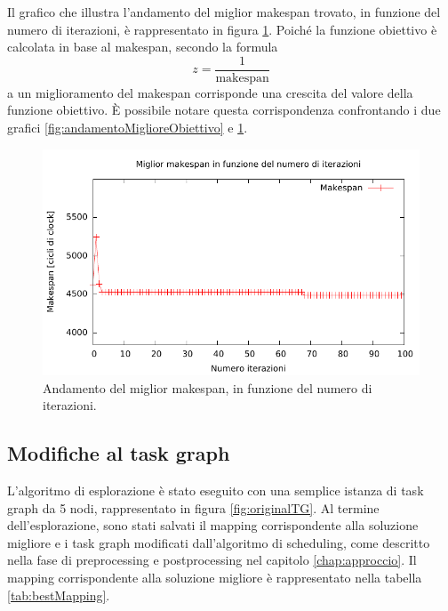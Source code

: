 Il grafico che illustra l'andamento del miglior makespan trovato, in funzione del numero
di iterazioni, \`e rappresentato in figura \ref{fig:andamentoMigliorMakespan}.
Poich\'e la funzione obiettivo \`e calcolata in base al makespan, secondo la formula
\begin{displaymath}
 z = \frac{1}{\text{makespan}}
\end{displaymath}
a un miglioramento del makespan corrisponde una crescita del valore della funzione obiettivo.
\`E possibile notare questa corrispondenza confrontando i due grafici \ref{fig:andamentoMiglioreObiettivo}
e \ref{fig:andamentoMigliorMakespan}.

\begin{figure}[tb]
 \begin{center}
  \includegraphics[width=\textwidth]{./capitoli/figure/cap6/bestClock.pdf}
  \caption{Andamento del miglior makespan, in funzione del numero
  di iterazioni.}
  \label{fig:andamentoMigliorMakespan}
 \end{center}
\end{figure}

\subsection{Modifiche al task graph}
\label{subsec:modificheTaskGraph}
L'algoritmo di esplorazione \`e stato eseguito con una semplice istanza
di task graph da 5 nodi, rappresentato in figura \ref{fig:originalTG}.
Al termine dell'esplorazione, sono stati salvati il mapping corrispondente alla soluzione
migliore e i task graph modificati dall'algoritmo di scheduling, come descritto nella
fase di preprocessing e postprocessing nel capitolo \ref{chap:approccio}.
Il mapping corrispondente alla soluzione migliore \`e rappresentato nella tabella
\ref{tab:bestMapping}.

